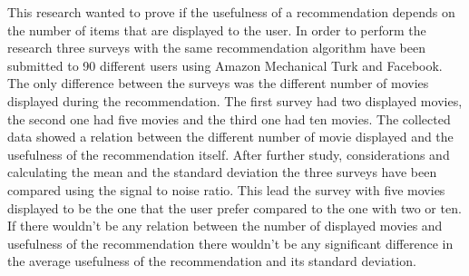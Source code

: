 This research wanted to prove if the usefulness of a recommendation depends on the number of items that are displayed to the user. In order to perform the research three surveys with the same recommendation algorithm have been submitted to 90 different users using Amazon Mechanical Turk and Facebook. The only difference between the surveys was the different number of movies displayed during the recommendation. The first survey had two displayed movies, the second one had five movies and the third one had ten movies. 
The collected data showed a relation between the different number of movie displayed and the usefulness of the recommendation itself. After further study, considerations and calculating the mean and the standard deviation the three surveys have been compared using the signal to noise ratio.
This lead the survey with five movies displayed to be the one that the user prefer compared to the one with two or ten. If there wouldn't be any relation between the number of displayed movies and usefulness of the recommendation there wouldn't be any significant difference in the average usefulness of the recommendation and its standard deviation. 

\acresetall